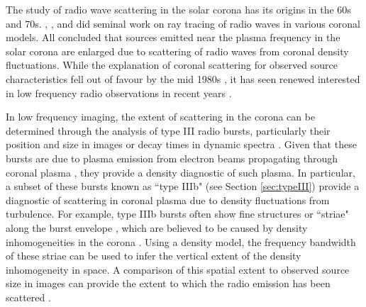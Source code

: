 The study of radio wave scattering in the solar corona has its origins in the 60s and 70s. \cite{Fokker1965}, \cite{Steinberg1971}, \cite{Stewart1972} and \cite{Riddle1974} did seminal work on ray tracing of radio waves in various coronal models. All concluded that sources emitted near the plasma frequency in the solar corona are enlarged due to scattering of radio waves from coronal density fluctuations. While the explanation of coronal scattering for observed source characteristics fell out of favour by the mid 1980s \citep{McLean1985}, it has seen renewed interested in low frequency radio observations in recent years  \citep{Thejappa2007,Thejappa2008,Kontar2017,Sharykin2018,Gordovskyy2019,Kontar2019}.

In low frequency imaging, the extent of scattering in the corona can be determined through the analysis of type III radio bursts, particularly their position and size in images or decay times in dynamic spectra \citep[e.g.][]{Kontar2019, Gordovskyy2019, Krupar2018}. Given that these bursts are due to plasma emission from electron beams propagating through coronal plasma \citep[see][for a review]{Reid2014}, they provide a density diagnostic of such plasma. In particular, a subset of these bursts known as ``type IIIb" (see Section \ref{sec:typeIII}) provide a diagnostic of scattering in coronal plasma due to density fluctuations from turbulence. For example, type IIIb bursts often show fine structures or ``striae" along the burst envelope \citep{Ellis1967,Ellis1969,DeLaNoe1972,DeLaNoe1975,Melnik2010b}, which are believed to be caused by density inhomogeneities in the corona \citep{Takakura1975}. Using a density model, the frequency bandwidth of these striae can be used to infer the vertical extent of the density inhomogeneity in space. A comparison of this spatial extent to observed source size in images can provide the extent to which the radio emission has been scattered \citep[e.g.][]{Kontar2017}.

